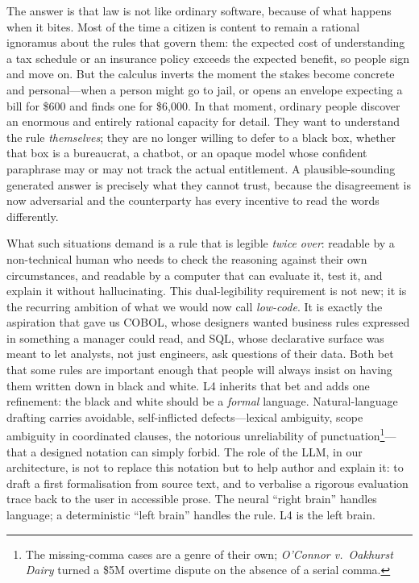 \documentclass[sigconf,nonacm]{acmart}
\begin{document}
The answer is that law is not like ordinary software, because of what
happens when it bites. Most of the time a citizen is content to remain a
rational ignoramus about the rules that govern them: the expected cost of
understanding a tax schedule or an insurance policy exceeds the expected
benefit, so people sign and move on. But the calculus inverts the moment
the stakes become concrete and personal---when a person might go to jail,
or opens an envelope expecting a bill for \$600 and finds one for
\$6{,}000. In that moment, ordinary people discover an enormous and
entirely rational capacity for detail. They want to understand the rule
\emph{themselves}; they are no longer willing to defer to a black box,
whether that box is a bureaucrat, a chatbot, or an opaque model whose
confident paraphrase may or may not track the actual entitlement. A
plausible-sounding generated answer is precisely what they cannot trust,
because the disagreement is now adversarial and the counterparty has every
incentive to read the words differently.

What such situations demand is a rule that is legible \emph{twice over}:
readable by a non-technical human who needs to check the reasoning against
their own circumstances, and readable by a computer that can evaluate it,
test it, and explain it without hallucinating. This dual-legibility
requirement is not new; it is the recurring ambition of what we would now call
\emph{low-code}. It is exactly the aspiration that gave us COBOL,
whose designers wanted business rules expressed in something a manager
could read, and SQL, whose declarative surface was meant to let analysts,
not just engineers, ask questions of their data. Both bet that some rules
are important enough that people will always insist on having them written
down in black and white. L4 inherits that bet and adds one refinement: the
black and white should be a \emph{formal} language. Natural-language
drafting carries avoidable, self-inflicted defects---lexical ambiguity,
scope ambiguity in coordinated clauses, the notorious unreliability of
punctuation\footnote{The missing-comma cases are a genre of their own;
\emph{O'Connor v.\ Oakhurst Dairy} turned a \$5M overtime dispute on the
absence of a serial comma.}---that a designed notation can simply
forbid. The role of the LLM, in our architecture, is not to replace this
notation but to help author and explain it: to draft a first formalisation
from source text, and to verbalise a rigorous evaluation trace back to the
user in accessible prose. The neural ``right brain'' handles language; a
deterministic ``left brain'' handles the rule. L4 is the left brain.
\end{document}
